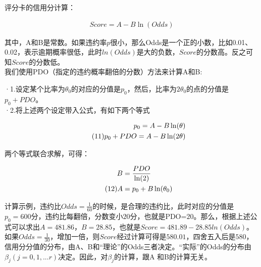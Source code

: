 \documentclass[12pt]{article}
\begin{document}
\begin{flushleft}
	\noindent\qquad 评分卡的信用分计算：
	
\end{flushleft}



\begin{align}  %
Score=A-B\ln(Odds)  \tag{10}
\end{align}


\begin{flushleft}
	\noindent\qquad 其中，A和B是常数。如果违约率$p$很小，那么Odds是一个正的小数，比如0.01、0.02，表示逾期概率很低，此时$ln(Odds)$是大的负数，$Score$的分数高。反之可知$Score$的分数低。\\
	\noindent\qquad 我们使用PDO（指定的违约概率翻倍的分数）方法来计算A和B:
	
	\vspace{1cm}
	\noindent\qquad·1.设定某个比率为$\theta_0$的对应的分值是$p_0$，然后，比率为$2\theta_0$的点的分值是$p_0+PDO$。\\
	\noindent\qquad·2.将上述两个设定带入公式，有如下两个等式\\
	

	
	
\end{flushleft}


\begin{align}  %
p_0=A-B\ln(\theta)  \notag \\  \tag{11}
p_0+PDO=A-B\ln(2 \theta)  
\end{align}


	\vspace{1cm}
\begin{flushleft}
	\noindent\qquad 两个等式联合求解，可得：
	
\end{flushleft}


\begin{align}  %
B&=\frac{PDO}{\ln(2)} \notag \\  \tag{12}
A&=p_0+B\ln(\theta_0)   
\end{align}

\begin{flushleft}
	\noindent\qquad 计算示例，违约比$Odds=\frac{1}{60}$的时候，是合理的违约比，此时对应的分值是$p_0=600$分，违约比每翻倍，分数变小$20$分，也就是PDO=$20$。那么，根据上述公式可以求出$A=481.86$，$B=28.85$，也就是$Score=481.89-28.85ln(Odds)$。如果$Odds=\frac{1}{30}$，增加一倍，则$Score$经过计算可得是$580.01$，四舍五入后是$580$，\\
	\noindent\qquad 信用分分值的分布，由A、B和“理论”的Odds三者决定。“实际”的Odds的分布由$\beta_j(j=0,1,...r)$决定。因此，对$\beta_j$的计算，跟A 和B的计算无关。
	
\end{flushleft}
\end{document}
